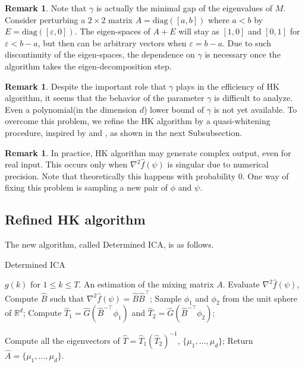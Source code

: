 \documentclass[twoside]{article}
\newcommand{\real}{\mathbb{R}}
\theoremstyle{definition}
\newtheorem{remark}[lemma]{Remark}
\newcommand{\eps}{\varepsilon}
\begin{document}
\begin{remark}
Note that $\gamma$ is actually the minimal gap of the eigenvalues of $M$.
Consider perturbing a $2\times 2$ matrix $A = \text{diag}([a,b])$ where $a<b$ by $E = \text{diag}([\eps,0])$. 
The eigen-spaces of $A+E$ will stay as $[1,0]$ and $[0,1]$ for $\eps < b-a$, but then can be arbitrary vectors when $\eps = b-a$.  
Due to such discontinuity of the eigen-spaces, the dependence on $\gamma$ is necessary once the algorithm takes the eigen-decomposition step. 
\end{remark}
\begin{remark}
Despite the important role that $\gamma$ plays in the efficiency of HK algorithm, it seems that the behavior of the parameter $\gamma$ is difficult to analyze. Even a polynomial(in the dimension $d$) lower bound of $\gamma$ is not yet available. 
To overcome this problem, we refine the HK algorithm by a quasi-whitening procedure, inspired by \citep{arora2012provable} and \citep{frieze1996learning}, as shown in the next Subsubsection.
\end{remark}
\begin{remark}
In practice, HK algorithm may generate complex output, even for real input. This occurs only when $\nabla^2\widehat{f}(\psi)$ is singular due to numerical precision. Note that theoretically this happens with probability 0. One way of fixing this problem is sampling a new pair of $\phi$ and $\psi$.
\end{remark}

\subsection{Refined HK algorithm}
\label{subsec:DICA}
The new algorithm, called Determined ICA, is as follows. 
\begin{algorithm}[H]
\caption{Determined ICA}
\begin{algorithmic}[1]
\INPUT $g(k)$ for $1\le k \le T$. 
\OUTPUT An estimation of the mixing matrix $A$. 
\STATE Evaluate $\nabla^2\widehat{f}(\psi)$, \\
\STATE Compute $\widehat{B}$ such that $\nabla^2\widehat{f}(\psi) = \widehat{B}\widehat{B}^{\top}$;
\STATE Sample $\phi_1$ and $\phi_2$ from the unit sphere of $\real^d$;
\STATE Compute $\widehat{T}_1 = \widehat{G}(\widehat{B}^{-\top}\phi_1)$ and  $\widehat{T}_2 =\widehat{G}(\widehat{B}^{-\top}\phi_2)$;

\STATE Compute all the eigenvectors of $\widehat{T} = \widehat{T}_1\left(\widehat{T}_2\right)^{-1}$, $\{\mu_1,\ldots,\mu_d\}$;
\STATE Return $\widehat{A} = \{\mu_1,\ldots,\mu_d\}$.
\end{algorithmic}
\end{algorithm}
\end{document}
